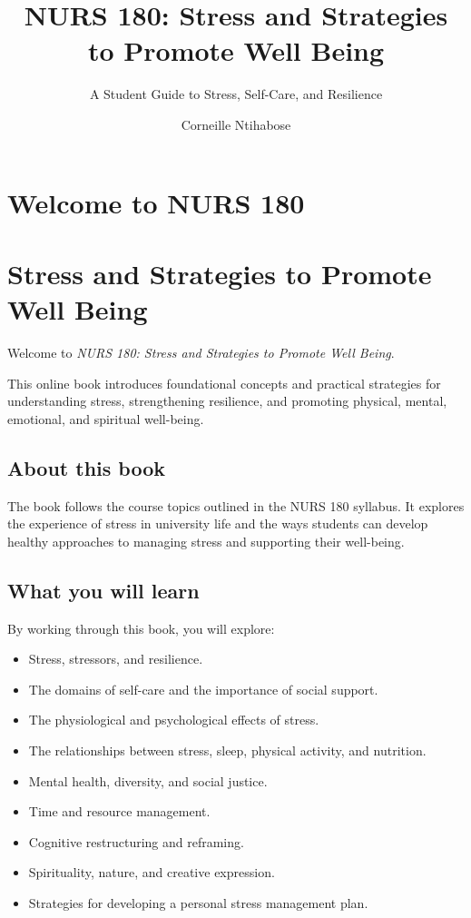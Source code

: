 \documentclass[
  letterpaper,
]{book}
\title{NURS 180: Stress and Strategies to Promote Well Being}
\subtitle{A Student Guide to Stress, Self-Care, and Resilience}
\author{Corneille Ntihabose}
\date{}
\providecommand{\tightlist}{%
  \setlength{\itemsep}{0pt}\setlength{\parskip}{0pt}}
\renewcommand*\contentsname{Table of contents}
\newcommand\contentsname{Table of contents}
\begin{document}
\frontmatter
\maketitle

\renewcommand*\contentsname{Table of contents}
{
\setcounter{tocdepth}{2}
\tableofcontents
}

\mainmatter
{}

\chapter{Welcome to NURS 180}\label{welcome-to-nurs-180}


\chapter{Stress and Strategies to Promote Well
Being}\label{stress-and-strategies-to-promote-well-being}

Welcome to \emph{NURS 180: Stress and Strategies to Promote Well Being}.

This online book introduces foundational concepts and practical
strategies for understanding stress, strengthening resilience, and
promoting physical, mental, emotional, and spiritual well-being.

\section{About this book}\label{about-this-book}

The book follows the course topics outlined in the NURS 180 syllabus. It
explores the experience of stress in university life and the ways
students can develop healthy approaches to managing stress and
supporting their well-being.

\section{What you will learn}\label{what-you-will-learn}

By working through this book, you will explore:

\begin{itemize}
\tightlist
\item
  Stress, stressors, and resilience.
\item
  The domains of self-care and the importance of social support.
\item
  The physiological and psychological effects of stress.
\item
  The relationships between stress, sleep, physical activity, and
  nutrition.
\item
  Mental health, diversity, and social justice.
\item
  Time and resource management.
\item
  Cognitive restructuring and reframing.
\item
  Spirituality, nature, and creative expression.
\item
  Strategies for developing a personal stress management plan.
\end{itemize}
\end{document}
